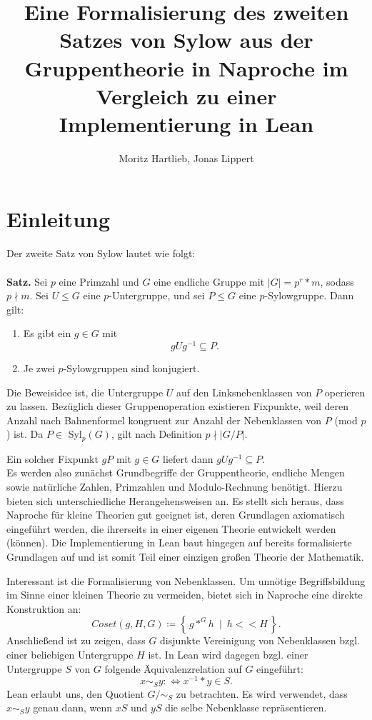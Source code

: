\documentclass[a4paper,12pt]{scrartcl}
\title{Eine Formalisierung des zweiten Satzes von Sylow aus der Gruppentheorie in Naproche im Vergleich zu einer Implementierung in Lean}
\author{Moritz Hartlieb, Jonas Lippert}
\newcommand{\st}{\ \mid\ }
\begin{document}
\maketitle
\newpage
{}

\section{Einleitung}

Der zweite Satz von Sylow lautet wie folgt:\\\\
\textbf{Satz.}
	Sei $p$ eine Primzahl und $G$ eine endliche Gruppe mit $|G|=p^{r}*m$, sodass $p\nmid m$. Sei $U \leq G$ eine $p$-Untergruppe, und sei $P \leq G$ eine $p$-Sylowgruppe. Dann gilt:
	\begin{enumerate}
		\item Es gibt ein $g\in G$ mit $$gUg^{-1}\subseteq P.$$
		\item Je zwei $p$-Sylowgruppen sind konjugiert.
	\end{enumerate}
Die Beweisidee ist, die Untergruppe $U$ auf den Linksnebenklassen von $P$ operieren zu lassen. Bezüglich dieser Gruppenoperation existieren Fixpunkte, weil deren Anzahl nach Bahnenformel kongruent zur Anzahl der Nebenklassen von $P$ (mod $p$) ist. Da $P\in$ Syl$_{p}(G)$, gilt nach Definition $p\nmid |G/P|$.

Ein solcher Fixpunkt $gP$ mit $g\in G$ liefert dann $gUg^{-1}\subseteq P.$
\\

Es werden also zunächst Grundbegriffe der Gruppentheorie, endliche Mengen sowie natürliche Zahlen, Primzahlen und Modulo-Rechnung benötigt. Hierzu bieten sich unterschiedliche Herangehensweisen an. 
Es stellt sich heraus, dass Naproche für kleine Theorien gut geeignet ist, deren Grundlagen axiomatisch eingeführt werden, die ihrerseits in einer eigenen Theorie entwickelt werden (können). Die Implementierung in Lean baut hingegen auf bereits formalisierte Grundlagen auf und ist somit Teil einer einzigen großen Theorie der Mathematik. 

Interessant ist die Formalisierung von Nebenklassen. Um unnötige Begriffsbildung im Sinne einer kleinen Theorie zu vermeiden, bietet sich in Naproche eine direkte Konstruktion an: $$Coset\left(g, H, G\right) \coloneqq \left\{\,g *^{G} h \st h << H\,\right\}.$$ Anschließend ist zu zeigen, dass $G$ disjunkte Vereinigung von Nebenklassen bzgl. einer beliebigen Untergruppe $H$ ist.
In Lean wird dagegen bzgl. einer Untergruppe $S$ von $G$ folgende Äquivalenzrelation auf $G$ eingeführt: $$x\sim_{S} y :\Leftrightarrow x^{-1}*y\in S.$$
Lean erlaubt uns, den Quotient $G/\sim_{S}$ zu betrachten. Es wird verwendet, dass $x\sim_{S} y$ genau dann, wenn $xS$ und $yS$ die selbe Nebenklasse repräsentieren. \\
\end{document}
